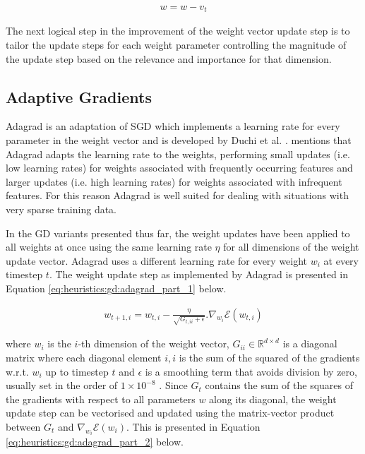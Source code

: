 \begin{equation}
    \label{eq:heuristics:gd:nag_part_2}
    \begin{split}
        w = w - v_{t}
    \end{split}
\end{equation}

The next logical step in the improvement of the weight vector update step is to tailor the update steps for each weight parameter controlling the magnitude of the update step based on the relevance and importance for that dimension.

\subsection{Adaptive Gradients}
\label{sec:heuristics:adagrad}

\Acl{Adagrad} is an adaptation of \ac{SGD} which implements a learning rate for every parameter in the weight vector and is developed by Duchi et al. \cite{ref:duchi:2011}. \citeauthor{ref:ruder:2016} \cite{ref:ruder:2016} mentions that \Ac{Adagrad} adapts the learning rate to the weights, performing small updates (i.e. low learning rates) for weights associated with frequently occurring features and larger updates (i.e. high learning rates) for weights associated with infrequent features. For this reason \ac{Adagrad} is well suited for dealing with situations with very sparse training data.

In the \ac{GD} variants presented thus far, the weight updates have been applied to all weights at once using the same learning rate $\eta$ for all dimensions of the weight update vector. \Ac{Adagrad} uses a different learning rate for every weight $w_{i}$ at every timestep $t$. The weight update step as implemented by \ac{Adagrad} is presented in Equation \ref{eq:heuristics:gd:adagrad_part_1} below.

\begin{equation}
    \label{eq:heuristics:gd:adagrad_part_1}
    \begin{split}
        w_{t+1,i} = w_{t,i} - \frac{\eta}{\sqrt{G_{t,ii} + \epsilon}}.\nabla_{w_{i}}\mathcal{E}(w_{t,i})
    \end{split}
\end{equation}

where $w_{i}$ is the $i$-th dimension of the weight vector, $G_{ii} \in \mathbb{R}^{d \times d}$ is a diagonal matrix where each diagonal element $i,i$ is the sum of the squared of the gradients w.r.t. $w_{i}$ up to timestep $t$ and $\epsilon$ is a smoothing term that avoids division by zero, usually set in the order of $1 \times 10^{-8}$ \cite{ref:ruder:2016}. Since $G_{t}$ contains the sum of the squares of the gradients with respect to all parameters $w$ along its diagonal, the weight update step can be vectorised and updated using the matrix-vector product between $G_{t}$ and $\nabla_{w_{i}}\mathcal{E}(w_{i})$. This is presented in Equation \ref{eq:heuristics:gd:adagrad_part_2} below.

